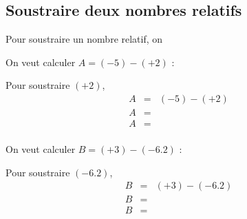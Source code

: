 \subsection{Soustraire deux nombres relatifs}

\begin{myprop}
	Pour soustraire un nombre relatif, on %
\end{myprop}

\begin{myexs}
	On veut calculer $A = (-\num{5}) - (+2)$ :
	
	Pour soustraire $(+2)$, %
	\begin{eqnarray*}
		A &=& (-5) - (+2) \\
		A &=& \\ %
		A &=& \\ %
	\end{eqnarray*} 
	
	\vspace*{1cm}
	
	On veut calculer $B = (+\num{3}) - (-\num{6.2})$ :
	
	Pour soustraire $(-\num{6.2})$, %
	\begin{eqnarray*}
		B &=& (+\num{3}) - (-\num{6.2}) \\
		B &=& \\ %
		B &=& \\ %
	\end{eqnarray*}  
\end{myexs}
